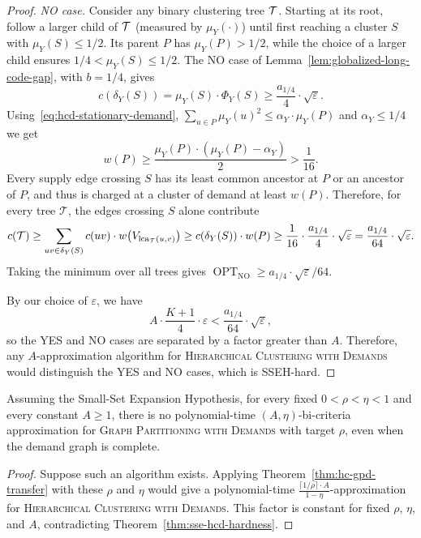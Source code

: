 \begin{proof}
    \emph{NO case.} Consider any binary clustering tree $\mathcal{T}$. Starting at its root, follow a larger child of $\mathcal{T}$ (measured by $\mu_Y(\cdot)$) until first reaching a cluster $S$ with $\mu_Y(S)\leq1/2$. Its parent $P$ has $\mu_Y(P)>1/2$, while the choice of a larger child ensures $1/4<\mu_Y(S)\leq1/2$. The NO case of Lemma~\ref{lem:globalized-long-code-gap}, with $b=1/4$, gives
    \[
        c(\delta_Y(S))=\mu_Y(S)\cdot \Phi_Y(S)
        \geq\frac{a_{1/4}}{4}\cdot \sqrt{\varepsilon}.
    \]
    Using~\eqref{eq:hcd-stationary-demand}, $\sum_{u\in P}\mu_Y(u)^2\leq\alpha_Y\cdot \mu_Y(P)$ and $\alpha_Y\leq 1/4$ we get
    \[
        w(P)\geq\frac{\mu_Y(P)\cdot(\mu_Y(P)-\alpha_Y)}2
        >\frac1{16}.
    \]
    Every supply edge crossing $S$ has its least common ancestor at $P$ or an ancestor of $P$, and thus is charged at a cluster of demand at least $w(P)$. Therefore, for every tree $\mathcal{T}$, the edges crossing $S$ alone contribute
    \[
        c(\mathcal{T})
        \geq\sum_{uv\in\delta_Y(S)}c(uv)\cdot
          w\mathopen{}\left( V_{\operatorname{lca}_{\mathcal{T}}(u,v)} \right)
        \geq c(\delta_Y(S))\cdot w(P)
        \geq\frac{1}{16}\cdot\frac{a_{1/4}}{4}\cdot\sqrt{\varepsilon}
        =\frac{a_{1/4}}{64}\cdot\sqrt{\varepsilon}.
    \]
    Taking the minimum over all trees gives $\operatorname{OPT}_{\mathrm{NO}}\geq a_{1/4}\cdot\sqrt{\varepsilon}/64$.

    By our choice of $\varepsilon$, we have
    \[
        A\cdot\frac{K+1}{4}\cdot\varepsilon
        <\frac{a_{1/4}}{64}\cdot\sqrt{\varepsilon},
    \]
    so the YES and NO cases are separated by a factor greater than $A$. Therefore, any $A$-approximation algorithm for \textsc{Hierarchical Clustering with Demands} would distinguish the YES and NO cases, which is SSEH-hard.
\end{proof}

\begin{corollary}\label{cor:sse-gpd-bicriteria-hardness}
    Assuming the Small-Set Expansion Hypothesis, for every fixed $0<\rho<\eta<1$ and every constant $A\geq 1$, there is no polynomial-time $(A,\eta)$-bi-criteria approximation for \textsc{Graph Partitioning with Demands} with target $\rho$, even when the demand graph is complete.
\end{corollary}
\begin{proof}
    Suppose such an algorithm exists. Applying Theorem~\ref{thm:hc-gpd-transfer} with these $\rho$ and $\eta$ would give a polynomial-time
    $\frac{\lceil1/\rho\rceil \cdot A}{1-\eta}$-approximation for \textsc{Hierarchical Clustering with Demands}. This factor is constant for fixed $\rho$, $\eta$, and $A$, contradicting Theorem~\ref{thm:sse-hcd-hardness}.
\end{proof}

